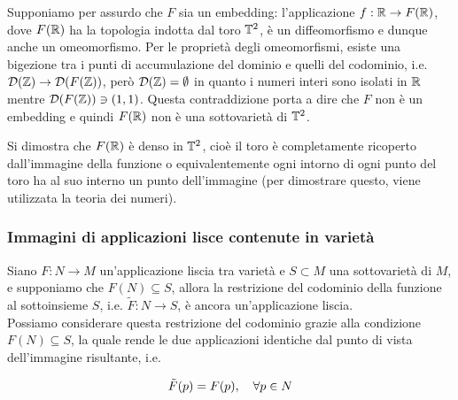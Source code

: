 Supponiamo per assurdo che $ F $ sia un embedding: l'applicazione $ f : \mathbb{R} \to F(\mathbb{R}) $, dove $ F(\mathbb{R}) $ ha la topologia indotta dal toro $ \mathbb{T}^{2} $, è un diffeomorfismo e dunque anche un omeomorfismo. Per le proprietà degli omeomorfismi, esiste una bigezione tra i punti di accumulazione del dominio e quelli del codominio, i.e. $ \mathcal{D}(\mathbb{Z}) \to \mathcal{D}(F(\mathbb{Z})) $, però $ \mathcal{D}(\mathbb{Z}) = \emptyset $ in quanto i numeri interi sono isolati in $ \mathbb{R} $ mentre $ \mathcal{D}(F(\mathbb{Z})) \ni (1,1) $. Questa contraddizione porta a dire che $ F $ non è un embedding e quindi $ F(\mathbb{R}) $ non è una sottovarietà di $ \mathbb{T}^{2} $.

\begin{remark}
	Si dimostra che $ F(\mathbb{R}) $ è denso in $ \mathbb{T}^{2} $, cioè il toro è completamente ricoperto dall'immagine della funzione o equivalentemente ogni intorno di ogni punto del toro ha al suo interno un punto dell'immagine (per dimostrare questo, viene utilizzata la teoria dei numeri).
\end{remark}

\subsubsection{Immagini di applicazioni lisce contenute in varietà}

\begin{theorem}\label{thm:smooth-restriction-subman}
	Siano $ F : N \to M $ un'applicazione liscia tra varietà e $ S \subset M $ una sottovarietà di $ M $, e supponiamo che $ F(N) \subseteq S $, allora la restrizione del codominio della funzione al sottoinsieme $ S $, i.e. $ \tilde{F} : N \to S $, è ancora un'applicazione liscia. \\
	Possiamo considerare questa restrizione del codominio grazie alla condizione $ F(N) \subseteq S $, la quale rende le due applicazioni identiche dal punto di vista dell'immagine risultante, i.e.
	
	\begin{equation}
		\tilde{F}(p) = F(p) \qcomma \forall p \in N
	\end{equation}
\end{theorem}

